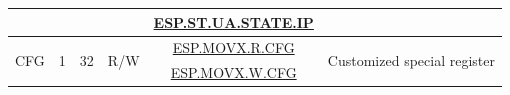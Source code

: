 \begin{ThreePartTable}
\begin{longtable}[c]{|l|c|c|c|c|l|}
    & & & & \hyperref[instruction:ESPSTUA_STATEIP]{ESP.ST.UA.STATE.IP} & \\\hline

\multirow{2}{*}{CFG} & \multirow{2}{*}{1} & \multirow{2}{*}{32} & \multirow{2}{*}{R/W} & \hyperref[instruction:ESPMOVXRCFG]{ESP.MOVX.R.CFG}  & \multirow{2}{*}{Customized special register} \\\cline{5-5}

  & & & & \hyperref[instruction:ESPMOVXWCFG]{ESP.MOVX.W.CFG}  & \\\hline

\end{longtable}

\end{ThreePartTable}

